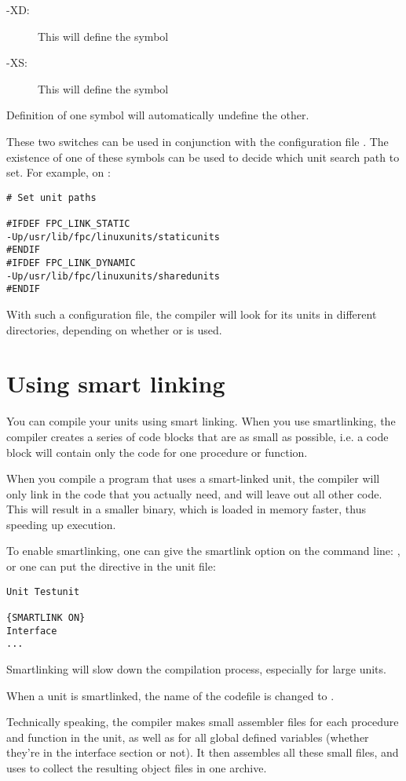 \begin{description}
\item [-XD:\ ] This will define the symbol 
\item [-XS:\ ] This will define the symbol 
\end{description}
Definition of one symbol will automatically undefine the other.

These two switches can be used in conjunction with the configuration file
. The existence of one of these symbols can be used to
decide which unit search path to set. For example, on \linux:
\begin{verbatim}
# Set unit paths

#IFDEF FPC_LINK_STATIC
-Up/usr/lib/fpc/linuxunits/staticunits
#ENDIF
#IFDEF FPC_LINK_DYNAMIC
-Up/usr/lib/fpc/linuxunits/sharedunits
#ENDIF
\end{verbatim}
With such a configuration file, the compiler will look for its units in
different directories, depending on whether  or  is used.

\section{Using smart linking}
\label{se:SmartLinking}

You can compile your units using smart linking. When you use smartlinking,
the compiler creates a series of code blocks that are as small as possible,
i.e. a code block will contain only the code for one procedure or function.

When you compile a program that uses a smart-linked unit, the compiler will
only link in the code that you actually need, and will leave out all other
code. This will result in a smaller binary, which is loaded in memory
faster, thus speeding up execution.

To enable smartlinking, one can give the smartlink option on the command
line: , or one can put the  directive in
the unit file:
\begin{verbatim}
Unit Testunit

{SMARTLINK ON}
Interface
...
\end{verbatim}
Smartlinking will slow down the compilation process, especially for large
units.

When a unit  is smartlinked, the name of the codefile is
changed to .

Technically speaking, the compiler makes small assembler files for each
procedure and function in the unit, as well as for all global defined
variables (whether they're in the interface section or not). It then
assembles all these small files, and uses  to collect the resulting
object files in one archive.

